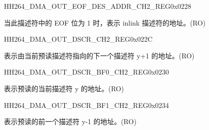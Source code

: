     
    \begin{register}{H}{H264\_DMA\_OUT\_EOF\_DES\_ADDR\_CH2\_REG}{0x0228}\label{regdesc:H264DMAOUTEOFDESADDRCH2REG}
    \regnewline%
    \begin{regdesc}\begin{reglist}
    \label{fielddesc:H264DMAOUTEOFDESADDRCH2}\item [H264\_DMA\_OUT\_EOF\_DES\_ADDR\_CH2] 当此描述符中的 EOF 位为 1 时，表示 inlink 描述符的地址。(RO)
    \end{reglist}\end{regdesc}
    \end{register}
    
    
    \begin{register}{H}{H264\_DMA\_OUT\_DSCR\_CH2\_REG}{0x022C}\label{regdesc:H264DMAOUTDSCRCH2REG}
    \regnewline%
    \begin{regdesc}\begin{reglist}
    \label{fielddesc:H264DMAOUTLINKDSCRCH2}\item [H264\_DMA\_OUTLINK\_DSCR\_CH2] 表示由当前预读描述符指向的下一个描述符 y+1 的地址。(RO)
    \end{reglist}\end{regdesc}
    \end{register}
    
    
    \begin{register}{H}{H264\_DMA\_OUT\_DSCR\_BF0\_CH2\_REG}{0x0230}\label{regdesc:H264DMAOUTDSCRBF0CH2REG}
    \regnewline%
    \begin{regdesc}\begin{reglist}
    \label{fielddesc:H264DMAOUTLINKDSCRBF0CH2}\item [H264\_DMA\_OUTLINK\_DSCR\_BF0\_CH2] 表示预读的当前描述符 y 的地址。(RO)
    \end{reglist}\end{regdesc}
    \end{register}
    
    
    \begin{register}{H}{H264\_DMA\_OUT\_DSCR\_BF1\_CH2\_REG}{0x0234}\label{regdesc:H264DMAOUTDSCRBF1CH2REG}
    \regnewline%
    \begin{regdesc}\begin{reglist}
    \label{fielddesc:H264DMAOUTLINKDSCRBF1CH2}\item [H264\_DMA\_OUTLINK\_DSCR\_BF1\_CH2] 表示预读的前一个描述符 y-1 的地址。(RO)
    \end{reglist}\end{regdesc}
    \end{register}
    

